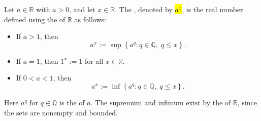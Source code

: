 \begin{definition} \label{definition:exponents_of_real_numbers_by_real_numbers_via_supremum}
    Let $a \in \mathbb{R}$ with $a > 0$, and let $x \in \mathbb{R}$. The , denoted by \hl{$a^x$}, is the real number defined using the  of $\mathbb{R}$ as follows:
    \begin{itemize}
        \item If $a > 1$, then
            $$a^x := \sup\left\{ a^q : q \in \mathbb{Q},\; q \leq x \right\}.$$
        \item If $a = 1$, then $1^x := 1$ for all $x \in \mathbb{R}$.
        \item If $0 < a < 1$, then
            $$a^x := \inf\left\{ a^q : q \in \mathbb{Q},\; q \leq x \right\}.$$
    \end{itemize}
    Here $a^q$ for $q \in \mathbb{Q}$ is the  of $a$. The supremum and infimum exist by the  of $\mathbb{R}$, since the sets are nonempty and bounded.
\end{definition}
